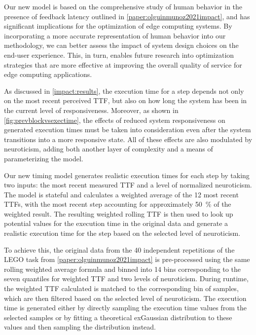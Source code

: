 Our new model is based on the comprehensive study of human behavior in the presence of feedback latency outlined in \cref{paper:olguinmunoz2021impact}, and has significant implications for the optimization of edge computing systems.
By incorporating a more accurate representation of human behavior into our methodology, we can better assess the impact of system design choices on the end-user experience.
This, in turn, enables future research into optimization strategies that are more effective at improving the overall quality of service for edge computing applications.

\medskip
As discussed in \cref{impact:results}, the execution time for a step depends not only on the most recent perceived \gls{TTF}, but also on how long the system has been in the current level of responsiveness.
Moreover, as shown in \cref{fig:prevblockvsexectime}, the effects of reduced system responsiveness on generated execution times must be taken into consideration even after the system transitions into a more responsive state.
All of these effects are also modulated by neuroticism, adding both another layer of complexity and a means of parameterizing the model.

Our new timing model generates realistic execution times for each step by taking two inputs: the most recent measured \gls{TTF} and a level of normalized neuroticism.
The model is stateful and calculates a weighted average of the 12 most recent \glspl{TTF}, with the most recent step accounting for approximately \SI{50}{\percent} of the weighted result.
The resulting weighted rolling \gls{TTF} is then used to look up potential values for the execution time in the original data and generate a realistic execution time for the step based on the selected level of neuroticism.

To achieve this, the original data from the \num{40} independent repetitions of the LEGO task from \cref{paper:olguinmunoz2021impact} is pre-processed using the same rolling weighted average formula and binned into \num{14} bins corresponding to the seven quantiles for weighted TTF and two levels of neuroticism.
During runtime, the weighted \gls{TTF} calculated is matched to the corresponding bin of samples, which are then filtered based on the selected level of neuroticism.
The execution time is generated either by directly sampling the execution time values from the selected samples or by fitting a theoretical \gls{exGaussian} distribution to these values and then sampling the distribution instead.

